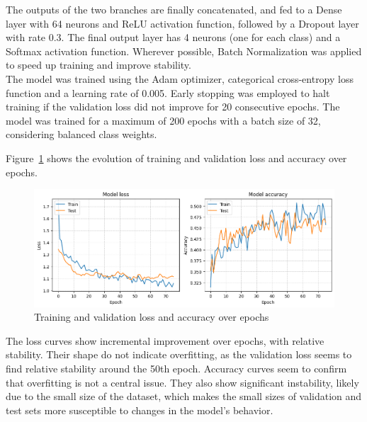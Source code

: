 The outputs of the two branches are finally concatenated, and
fed to a Dense layer with 64 neurons and ReLU activation function,
followed by a Dropout layer with rate 0.3.
The final output layer has 4 neurons (one for each class)
and a Softmax activation function.
Wherever possible, Batch Normalization was applied to speed up training
and improve stability.\\

The model was trained using the Adam optimizer, categorical
cross-entropy loss function and a learning rate of 0.005.
Early stopping was employed to halt training if the validation loss
did not improve for 20 consecutive epochs.
The model was trained for a maximum of 200 epochs with a batch size
of 32, considering balanced class weights.

Figure~\ref{fig:loss_acc} shows the evolution of training and
validation loss and accuracy over epochs.
\begin{figure}[H]
    \centering
    \includegraphics[width=1\textwidth]{plotsss/ts_loss_acc.png}
    \caption{Training and validation loss and accuracy over epochs}
    \label{fig:loss_acc}
\end{figure}

The loss curves show incremental improvement over epochs,
with relative stability.
Their shape do not indicate overfitting, as the validation loss
seems to find relative stability around the 50th epoch.
Accuracy curves seem to confirm that overfitting is not a central
issue.
They also show significant instability, likely due to the small
size of the dataset, which makes the small sizes of validation
and test sets more susceptible to changes in the model's behavior.


